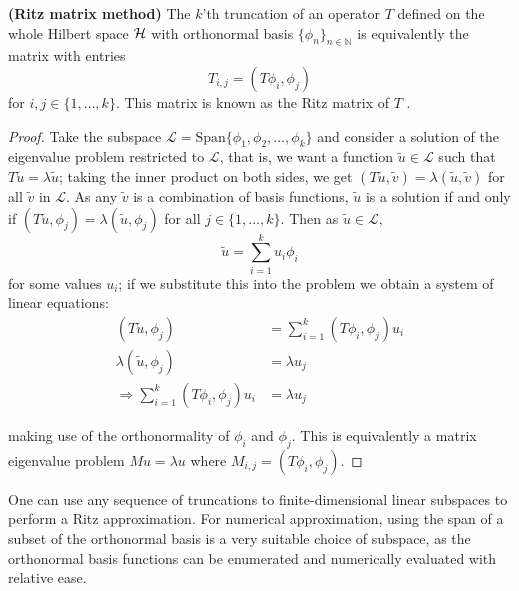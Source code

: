 \documentclass[../main.tex]{subfiles}
\begin{document}
\begin{proposition}{\textbf{(Ritz matrix method)}}
\label{thm:ritz-method}
  The $k$'th truncation of an operator $T$ defined on the whole Hilbert space
  $\mathcal{H}$ with orthonormal basis $\{\phi_n\}_{n \in \mathbb{N}}$ 
  is equivalently the matrix with entries
    $$T_{i,j} = (T\phi_i, \phi_j)$$
  for $i, j \in \{1, \hdots, k\}$.
  This matrix is known as the Ritz matrix of $T$ \cite{davies2003spectral}.
\end{proposition}
\begin{proof}
Take the subspace $\mathcal{L} = \text{Span}\{\phi_1, \phi_2, \hdots, \phi_k\}$ and
consider a solution
of the eigenvalue problem restricted to $\mathcal{L}$, that is, we want a function
$\tilde{u} \in \mathcal{L}$ such that $T\tilde{u} = \lambda\tilde{u}$; taking the inner
product on both sides, we get 
$(T\tilde{u}, \tilde{v}) = \lambda (\tilde{u}, \tilde{v})$ for all $\tilde{v}$
in $\mathcal{L}$. As any $\tilde{v}$ is a combination of basis functions, $\tilde{u}$
is a solution if and only if
$(T\tilde{u}, \phi_j) = \lambda (\tilde{u}, \phi_j)$ for all $j \in
\{1, \hdots, k\}$. Then as $\tilde{u} \in \mathcal{L},$ 
$$\tilde{u} = \sum_{i=1}^k u_i \phi_i$$
for some values $u_i$; if we substitute this into the problem we obtain a system
of linear equations:
\begin{align*}
  (T\tilde{u}, \phi_j) & = \sum_{i=1}^k (T\phi_i, \phi_j) u_i \\
  \lambda (\tilde{u}, \phi_j) & = \lambda u_j \\
  \Rightarrow \sum_{i=1}^k (T\phi_i, \phi_j) u_i & = \lambda u_j
\end{align*}

making use of the orthonormality of $\phi_i$ and $\phi_j$. This is equivalently
a matrix eigenvalue problem $M u = \lambda u$ where $M_{i,j} = (T\phi_i, \phi_j)$.
\end{proof}

One can use any sequence of truncations to finite-dimensional linear subspaces
to perform a Ritz approximation. For numerical approximation, using the span of
a subset of the orthonormal basis is a very suitable choice of subspace, as the
orthonormal basis functions can be enumerated and numerically evaluated with relative ease.
\end{document}
